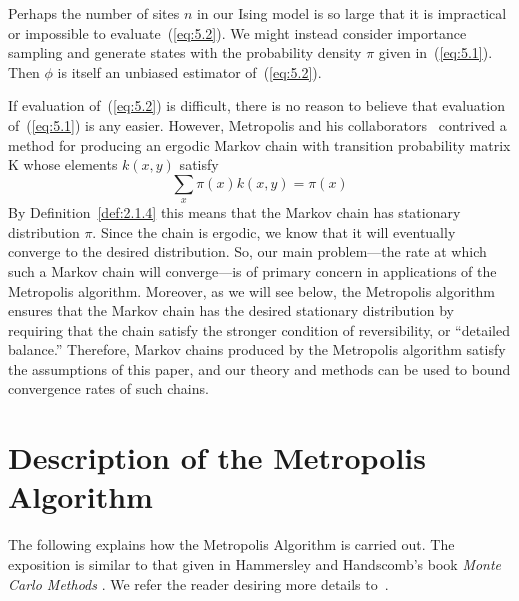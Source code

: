 \documentclass[12pt,letterpaper]{report}
\theoremstyle{plain}
\theoremstyle{definition}
\theoremstyle{remark}
\numberwithin{theorem}{chapter}
\numberwithin{claim}{chapter}
\numberwithin{equation}{chapter}
\numberwithin{conjecture}{chapter}
\newcommand\<{\ensuremath{\langle}}
\renewcommand\>{\ensuremath{\rangle}}
\begin{document}
Perhaps the number of sites $n$ in our Ising model is so large that it is
impractical or impossible to evaluate~(\ref{eq:5.2}).
We might instead consider importance sampling and generate states with
the probability density $\pi$ given in~(\ref{eq:5.1}).
Then $\phi$ is itself an unbiased estimator of~(\ref{eq:5.2}).

If evaluation of~(\ref{eq:5.2}) is difficult, there is no reason to believe that
evaluation of~(\ref{eq:5.1}) is any easier. However, Metropolis and his
collaborators~\cite{Metropolis:1953} contrived a method for producing an ergodic 
%
%
%
%
Markov chain with transition probability matrix K whose elements $k(x,y)$ satisfy
\[
\sum_x \pi(x) k(x,y) = \pi(x)
\]
By 
Definition~\ref{def:2.1.4}
this means that the Markov chain has stationary distribution $\pi$. Since the
chain is ergodic, we know that it will eventually converge to the desired
distribution. So, our main 
problem---the rate at which such a Markov chain will converge---is of primary
concern in applications of the Metropolis algorithm. Moreover, as we will see
below, the Metropolis algorithm ensures that the Markov chain has the desired
stationary distribution by requiring that the chain satisfy the stronger
condition of reversibility, or ``detailed balance.'' Therefore, Markov chains
produced by the Metropolis algorithm satisfy the assumptions of this paper,
and our theory and methods can be used to bound convergence rates of such chains. 

\section{Description of the Metropolis Algorithm}
\label{sec:descr-metr-algor}
The following explains how the Metropolis Algorithm is carried out. The exposition is
similar to that given in Hammersley and Handscomb's book 
\emph{Monte Carlo Methods} \cite{Hammersley:1964}. We refer the reader desiring
more details to~\cite[Section 9.3]{Hammersley:1964}.
\end{document}
